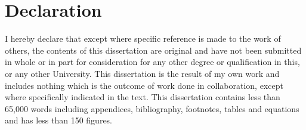 \chapter*{Declaration}

I hereby declare that except where specific reference is made to the work of others,
the contents of this dissertation are original and have not been submitted in whole
or in part for consideration for any other degree or qualification in this,
or any other University. This dissertation is the result of my own work
and includes nothing which is the outcome of work done in collaboration,
except where specifically indicated in the text.
This dissertation contains less than 65,000 words including
appendices, bibliography, footnotes, tables and equations and has
less than 150 figures.
